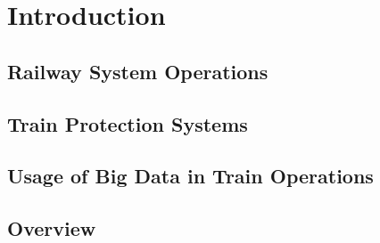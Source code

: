 \section{Introduction}
\label{sec:Introduction}

\subsection{Railway System Operations}
\label{sec:RailwaySystemOperations}

\subsection{Train Protection Systems}
\label{sec:TrainProtectionSystems}

\subsection{Usage of Big Data in Train Operations}
\label{sec:UsageOfBigDataInTrainOperations}

\subsection{Overview}
\label{sec:Overview}